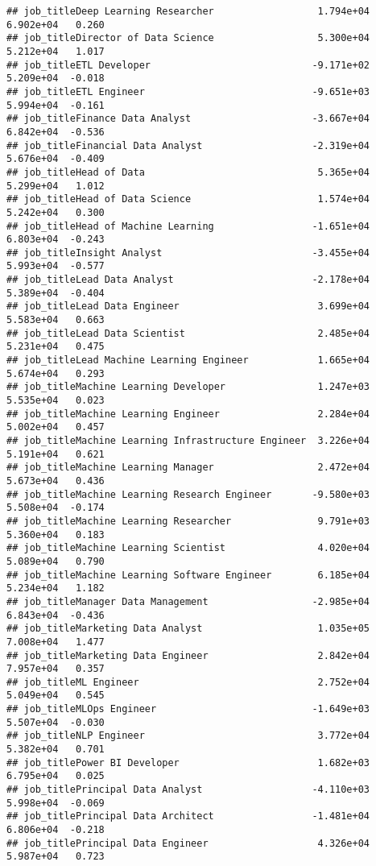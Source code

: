 \documentclass[
]{article}
\begin{document}
\begin{verbatim}
## job_titleDeep Learning Researcher                  1.794e+04  6.902e+04   0.260
## job_titleDirector of Data Science                  5.300e+04  5.212e+04   1.017
## job_titleETL Developer                            -9.171e+02  5.209e+04  -0.018
## job_titleETL Engineer                             -9.651e+03  5.994e+04  -0.161
## job_titleFinance Data Analyst                     -3.667e+04  6.842e+04  -0.536
## job_titleFinancial Data Analyst                   -2.319e+04  5.676e+04  -0.409
## job_titleHead of Data                              5.365e+04  5.299e+04   1.012
## job_titleHead of Data Science                      1.574e+04  5.242e+04   0.300
## job_titleHead of Machine Learning                 -1.651e+04  6.803e+04  -0.243
## job_titleInsight Analyst                          -3.455e+04  5.993e+04  -0.577
## job_titleLead Data Analyst                        -2.178e+04  5.389e+04  -0.404
## job_titleLead Data Engineer                        3.699e+04  5.583e+04   0.663
## job_titleLead Data Scientist                       2.485e+04  5.231e+04   0.475
## job_titleLead Machine Learning Engineer            1.665e+04  5.674e+04   0.293
## job_titleMachine Learning Developer                1.247e+03  5.535e+04   0.023
## job_titleMachine Learning Engineer                 2.284e+04  5.002e+04   0.457
## job_titleMachine Learning Infrastructure Engineer  3.226e+04  5.191e+04   0.621
## job_titleMachine Learning Manager                  2.472e+04  5.673e+04   0.436
## job_titleMachine Learning Research Engineer       -9.580e+03  5.508e+04  -0.174
## job_titleMachine Learning Researcher               9.791e+03  5.360e+04   0.183
## job_titleMachine Learning Scientist                4.020e+04  5.089e+04   0.790
## job_titleMachine Learning Software Engineer        6.185e+04  5.234e+04   1.182
## job_titleManager Data Management                  -2.985e+04  6.843e+04  -0.436
## job_titleMarketing Data Analyst                    1.035e+05  7.008e+04   1.477
## job_titleMarketing Data Engineer                   2.842e+04  7.957e+04   0.357
## job_titleML Engineer                               2.752e+04  5.049e+04   0.545
## job_titleMLOps Engineer                           -1.649e+03  5.507e+04  -0.030
## job_titleNLP Engineer                              3.772e+04  5.382e+04   0.701
## job_titlePower BI Developer                        1.682e+03  6.795e+04   0.025
## job_titlePrincipal Data Analyst                   -4.110e+03  5.998e+04  -0.069
## job_titlePrincipal Data Architect                 -1.481e+04  6.806e+04  -0.218
## job_titlePrincipal Data Engineer                   4.326e+04  5.987e+04   0.723

\end{verbatim}
\end{document}
